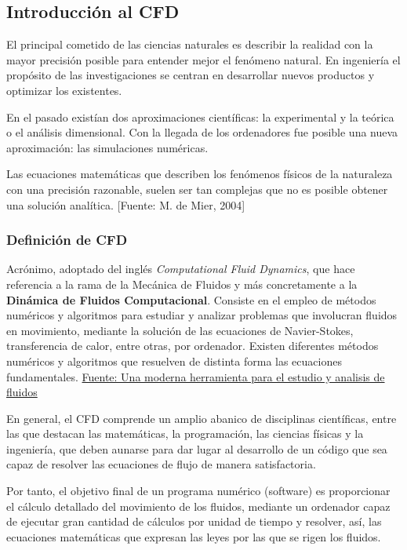 \subsection{Introducción al CFD}\label{header-n0}

El principal cometido de las ciencias naturales es describir la realidad
con la mayor precisión posible para entender mejor el fenómeno natural.
En ingeniería el propósito de las investigaciones se centran en
desarrollar nuevos productos y optimizar los existentes.

En el pasado existían dos aproximaciones científicas: la experimental y
la teórica o el análisis dimensional. Con la llegada de los ordenadores
fue posible una nueva aproximación: las simulaciones numéricas.

Las ecuaciones matemáticas que describen los fenómenos físicos de la
naturaleza con una precisión razonable, suelen ser tan complejas que no
es posible obtener una solución analítica. {[}Fuente: M. de Mier,
2004{]}

\subsubsection{Definición de CFD}\label{header-n8}

Acrónimo, adoptado del inglés \emph{Computational Fluid Dynamics}, que
hace referencia a la rama de la Mecánica de Fluidos y más concretamente
a la \textbf{Dinámica de Fluidos Computacional}. Consiste en el empleo
de métodos numéricos y algoritmos para estudiar y analizar problemas que
involucran fluidos en movimiento, mediante la solución de las ecuaciones
de Navier-Stokes, transferencia de calor, entre otras, por ordenador.
Existen diferentes métodos numéricos y algoritmos que resuelven de
distinta forma las ecuaciones fundamentales.
\href{http://docplayer.es/720690-Simulacion-de-fluidos-utilizando-computadores-una-moderna-herramienta-para-el-estudio-y-analisis-de-fluidos.html}{Fuente:
Una moderna herramienta para el estudio y analisis de fluidos}

En general, el CFD comprende un amplio abanico de disciplinas
científicas, entre las que destacan las matemáticas, la programación,
las ciencias físicas y la ingeniería, que deben aunarse para dar lugar
al desarrollo de un código que sea capaz de resolver las ecuaciones de
flujo de manera satisfactoria.

Por tanto, el objetivo final de un programa numérico (software) es
proporcionar el cálculo detallado del movimiento de los fluidos,
mediante un ordenador capaz de ejecutar gran cantidad de cálculos por
unidad de tiempo y resolver, así, las ecuaciones matemáticas que
expresan las leyes por las que se rigen los fluidos.

